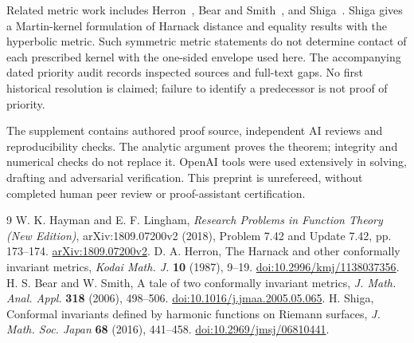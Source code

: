 \documentclass[11pt]{article}
\begin{document}
Related metric work includes Herron~\cite{Herron}, Bear and Smith~\cite{BS}, and Shiga~\cite{Shiga}. Shiga gives a Martin-kernel formulation of Harnack distance and equality results with the hyperbolic metric. Such symmetric metric statements do not determine contact of each prescribed kernel with the one-sided envelope used here. The accompanying dated priority audit records inspected sources and full-text gaps. No first historical resolution is claimed; failure to identify a predecessor is not proof of priority.

The supplement contains authored proof source, independent AI reviews and reproducibility checks. The analytic argument proves the theorem; integrity and numerical checks do not replace it. OpenAI tools were used extensively in solving, drafting and adversarial verification. This preprint is unrefereed, without completed human peer review or proof-assistant certification.

\begin{thebibliography}{9}
\small
{} W. K. Hayman and E. F. Lingham,
\emph{Research Problems in Function Theory (New Edition)},
arXiv:1809.07200v2 (2018), Problem 7.42 and Update 7.42, pp. 173--174.
\href{https://arxiv.org/abs/1809.07200v2}{arXiv:1809.07200v2}.
 D. A. Herron,
The Harnack and other conformally invariant metrics,
\emph{Kodai Math. J.} \textbf{10} (1987), 9--19.
\href{https://doi.org/10.2996/kmj/1138037356}{doi:10.2996/kmj/1138037356}.
 H. S. Bear and W. Smith,
A tale of two conformally invariant metrics,
\emph{J. Math. Anal. Appl.} \textbf{318} (2006), 498--506.
\href{https://doi.org/10.1016/j.jmaa.2005.05.065}{doi:10.1016/j.jmaa.2005.05.065}.
 H. Shiga,
Conformal invariants defined by harmonic functions on Riemann surfaces,
\emph{J. Math. Soc. Japan} \textbf{68} (2016), 441--458.
\href{https://doi.org/10.2969/jmsj/06810441}{doi:10.2969/jmsj/06810441}.
\end{thebibliography}
\end{document}

